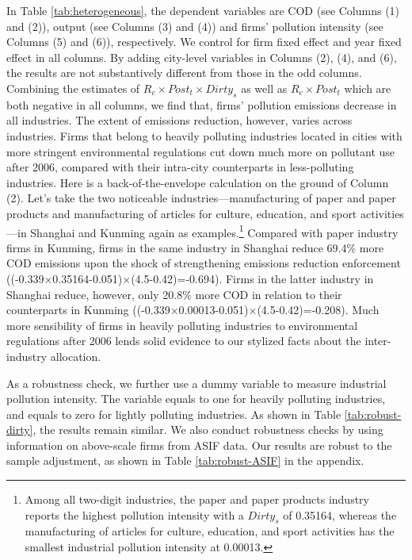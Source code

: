 \documentclass[12pt,english]{article}
\begin{document}
In Table \ref{tab:heterogeneous}, the dependent variables are COD (see Columns (1) and (2)), output (see Columns (3) and (4)) and firms' pollution intensity (see Columns (5) and (6)), respectively. We control for firm fixed effect and year fixed effect in all columns. By adding city-level variables in Columns (2), (4), and (6), the results are not substantively different from those in the odd columns. Combining the estimates of ${R}_{c} \times{Post}_{t}\times{Dirty}_{s}$ as well as ${R}_{c} \times{Post}_{t}$ which are both negative in all columns, we find that, firms' pollution emissions decrease in all industries. The extent of emissions reduction, however, varies across industries. Firms that belong to heavily polluting industries located in cities with more stringent environmental regulations cut down much more on pollutant use after 2006, compared with their intra-city counterparts in less-polluting industries. Here is a back-of-the-envelope calculation on the ground of Column (2). Let's take the two noticeable industries---manufacturing of paper and paper products and manufacturing of articles for culture, education, and sport activities---in Shanghai and Kunming again as examples.\footnote{Among all two-digit industries, the paper and paper products industry reports the highest pollution intensity with a ${Dirty}_{s}$ of 0.35164, whereas the manufacturing of articles for culture, education, and sport activities has the smallest industrial pollution intensity at 0.00013.} Compared with paper industry firms in Kunming, firms in the same industry in Shanghai reduce 69.4$\%$ more COD emissions upon the shock of strengthening emissions reduction enforcement ((-0.339$\times$0.35164-0.051)$\times$(4.5-0.42)=-0.694). Firms in the latter industry in Shanghai reduce, however, only 20.8$\%$ more COD in relation to their counterparts in Kunming ((-0.339$\times$0.00013-0.051)$\times$(4.5-0.42)=-0.208). Much more sensibility of firms in heavily polluting industries to environmental regulations after 2006 lends solid evidence to our stylized facts about the inter-industry allocation.

As a robustness check, we further use a dummy variable to measure industrial pollution intensity. The variable equals to one for heavily polluting industries, and equals to zero for lightly polluting industries. As shown in Table \ref{tab:robust-dirty}, the results remain similar. %
We also conduct robustness checks by using information on above-scale firms from ASIF data. Our results are robust to the sample adjustment, as shown in Table \ref{tab:robust-ASIF} in the appendix.
\end{document}
